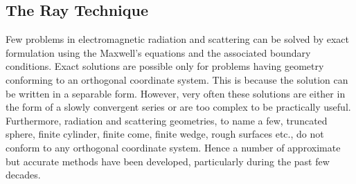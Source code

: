 \subsection{The Ray Technique}\label{LR_Ray_Technique}
Few problems in electromagnetic radiation and scattering can be solved by exact formulation using the Maxwell\rq s equations and the associated boundary conditions. Exact solutions are possible only for problems having geometry conforming to an orthogonal coordinate system. This is because the solution can be written in a separable form. However, very often these solutions are either in the form of a slowly convergent series or are too complex to be practically useful. Furthermore, radiation and scattering geometries, to name a few, truncated sphere, finite cylinder, finite come, finite wedge, rough surfaces etc., do not conform to any orthogonal coordinate system. Hence a number of approximate but accurate methods have been developed, particularly during the past few decades.




